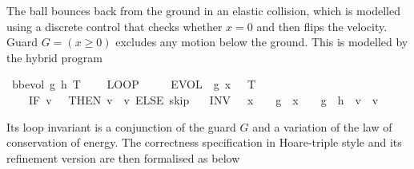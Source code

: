 \documentclass[envcountsame,envcountsect]{llncs}
\newcommand{\IF}[3]{\mathbf{if}\ #1\ \mathbf{then}\ #2\ \mathbf{else}\ #3}
\newcommand{\flow}{\varphi}
\newcommand{\reals}{\mathbb{R}}
\begin{document}
\begin{example}
The ball bounces back
from the ground in an elastic collision, which is modelled using a
discrete control that checks whether $x=0$ and then flips the
velocity.  Guard $G=(x\geq 0)$ excludes any motion
below the ground. This is modelled by the hybrid
program~\cite{Platzer18}
\begin{isabellebody}
\isanewline
{}\isamarkupfalse%
\ {\isachardoublequoteopen}bb{\isacharunderscore}evol\ g\ h\ T\ {\isasymequiv}\ \isanewline
\ \ {\isacharparenleft}LOOP\ {\isacharparenleft}\isanewline
\ \ \ \ {\isacharparenleft}EVOL\ {\isacharparenleft}{\isasymphi}\ g{\isacharparenright}\ {\isacharparenleft}x\ {\isasymge}\ {}{\isacharparenright}\ T{\isacharparenright}{\isacharsemicolon}\isanewline
\ \ \ \ {\isacharparenleft}IF\ {\isacharparenleft}v\ {\isacharequal}\ {}{\isacharparenright}\ THEN\ {\isacharparenleft}v\ {\isacharcolon}{\isacharcolon}{\isacharequal}\ {\isacharminus}v{\isacharparenright}\ ELSE\ skip{\isacharparenright}{\isacharparenright}\ \isanewline
\ \ INV\ {\isacharparenleft}{}\ {\isasymle}\ x\ {\isasymand}\ {}\ {\isasymcdot}\ g\ {\isasymcdot}\ x\ {\isacharequal}\ {}\ {\isasymcdot}\ g\ {\isasymcdot}\ h\ {\isacharplus}\ v\ {\isasymcdot}\ v{\isacharparenright}{\isacharparenright}{\isachardoublequoteclose}\isanewline
\end{isabellebody}
Its loop invariant is a conjunction of the guard $G$ and a variation of the law of conservation of energy. The correctness specification in Hoare-triple style and its refinement version are then formalised as below

\end{example}
\end{document}
